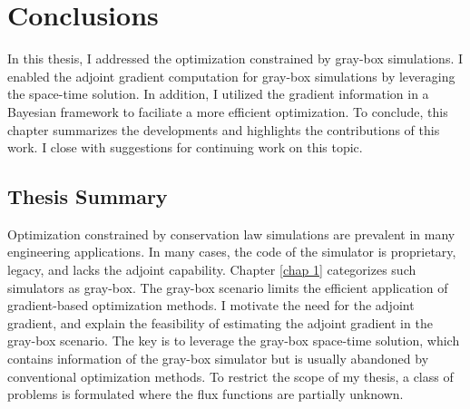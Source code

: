 \chapter{Conclusions}
\label{chapter 4}
In this thesis, I addressed the optimization constrained by gray-box simulations.
I enabled the adjoint gradient computation for gray-box simulations by leveraging the
space-time solution. In addition, I utilized the gradient information in a Bayesian
framework to faciliate a more efficient optimization. 
To conclude, this chapter summarizes the developments and highlights
the contributions of this work. I close with suggestions for continuing work
on this topic.


\section{Thesis Summary}
Optimization constrained by conservation law simulations are prevalent in many engineering
applications.
In many cases, the code of the simulator is proprietary, legacy, and
lacks the adjoint capability. 
Chapter \ref{chap 1} categorizes such simulators as gray-box.
The gray-box scenario limits the efficient application 
of gradient-based optimization methods.
I motivate the need for the
adjoint gradient, and explain the feasibility
of estimating the adjoint gradient in the gray-box scenario.
The key is to leverage the gray-box space-time solution, which contains information
of the gray-box simulator but is usually abandoned by conventional optimization methods.
To restrict the scope of my thesis, a class of problems is formulated where the
flux functions are partially unknown.\\

